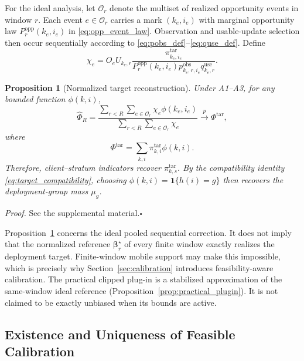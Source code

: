 \documentclass[letterpaper,journal]{IEEEtran}
\newtheorem{proposition}{Proposition}
\begin{document}
For the ideal analysis, let $\mathcal{O}_r$ denote the multiset of realized
opportunity events in window $r$.  Each event $e\in\mathcal{O}_r$ carries a
mark $(k_e,i_e)$ with marginal opportunity law
$P_r^{\mathrm{opp}}(k_e,i_e)$ in \eqref{eq:opp_event_law}.  Observation and
usable-update selection then occur sequentially according to
\eqref{eq:pobs_def}--\eqref{eq:quse_def}.  Define
\begin{equation}
 \chi_e
 =
 O_e U_{k_e,r}
 \frac{
 \pi^{\mathrm{tar}}_{k_e,i_e}
 }{
 P_r^{\mathrm{opp}}(k_e,i_e)
 p^{\mathrm{obs}}_{k_e,r,i_e}
 q^{\mathrm{use}}_{k_e,r}
 }.
 \label{eq:chi_event}
\end{equation}

\begin{proposition}[Normalized target reconstruction]
\label{prop:reconstruction}
Under A1--A3, for any bounded function $\phi(k,i)$,
\begin{equation}
 \widehat\Phi_R
 =
 \frac{
 \sum_{r<R}
 \sum_{e\in\mathcal{O}_r}
 \chi_e\phi(k_e,i_e)
 }{
 \sum_{r<R}
 \sum_{e\in\mathcal{O}_r}
 \chi_e
 }
 \xrightarrow{p}
 \Phi^{\mathrm{tar}},
 \label{eq:hajek_phi}
\end{equation}
where
\begin{equation}
 \Phi^{\mathrm{tar}}
 =
 \sum_{k,i}
 \pi^{\mathrm{tar}}_{k,i}\phi(k,i).
 \label{eq:target_phi}
\end{equation}
Therefore, client--stratum indicators recover
$\pi^{\mathrm{tar}}_{k,s}$.  By the compatibility identity
\eqref{eq:target_compatibility}, choosing
$\phi(k,i)=\mathbf{1}\{h(i)=g\}$ then recovers the deployment-group mass
$\mu_g$.
\end{proposition}

\noindent\emph{Proof.}
See the supplemental material.\hfill$\square$

Proposition~\ref{prop:reconstruction} concerns the ideal pooled sequential
correction.  It does not imply that the normalized reference
$\boldsymbol\beta_r^\star$ of every finite window exactly realizes the
deployment target.  Finite-window mobile support may make this impossible,
which is precisely why Section~\ref{sec:calibration} introduces
feasibility-aware calibration.  The practical clipped plug-in is a
stabilized approximation of the same-window ideal reference
(Proposition~\ref{prop:practical_plugin}).  It is not claimed to be
exactly unbiased when its bounds are active.

\subsection{Existence and Uniqueness of Feasible Calibration}
\label{subsec:theorem_calibration}
\end{document}
